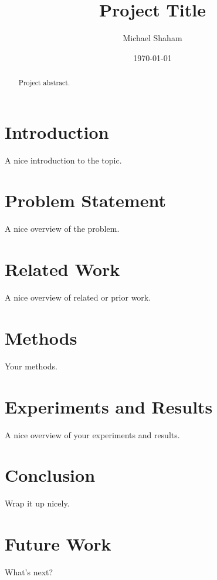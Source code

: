\documentclass[12pt]{article}
\title{Project Title}
\author{Michael Shaham}
\date{\monthyeardate\today}
\begin{document}
\maketitle

\begin{abstract}

Project abstract. \cite{SW:57}

\end{abstract}

\newpage
\tableofcontents
\newpage

\section{Introduction}

A nice introduction to the topic.

\section{Problem Statement}

A nice overview of the problem.

\section{Related Work}

A nice overview of related or prior work.

\section{Methods}

Your methods.

\section{Experiments and Results}

A nice overview of your experiments and results.

\section{Conclusion}

Wrap it up nicely.

\section{Future Work}

What's next?

\newpage


\end{document}
